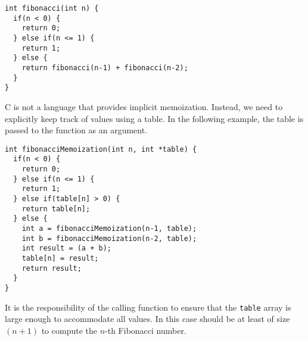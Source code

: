 \begin{verbatim}
int fibonacci(int n) {
  if(n < 0) {
    return 0;
  } else if(n <= 1) {
    return 1;
  } else {
    return fibonacci(n-1) + fibonacci(n-2);
  }
}
\end{verbatim}

C is not a language that provides implicit  
memoization.  Instead, 
we need to explicitly keep track of values using a table.  In the
following example, the table is passed to the function as an argument.

\begin{verbatim}
int fibonacciMemoization(int n, int *table) {
  if(n < 0) {
    return 0;
  } else if(n <= 1) {
    return 1;
  } else if(table[n] > 0) {
    return table[n];
  } else {
    int a = fibonacciMemoization(n-1, table);
    int b = fibonacciMemoization(n-2, table);
    int result = (a + b);
    table[n] = result;
    return result;
  }
}
\end{verbatim}

It is the responsibility of the calling function to ensure that the 
\texttt{table} array is large enough to accommodate all values.
In this case should be at least of size $(n+1)$ to compute the $n$-th Fibonacci
number.




